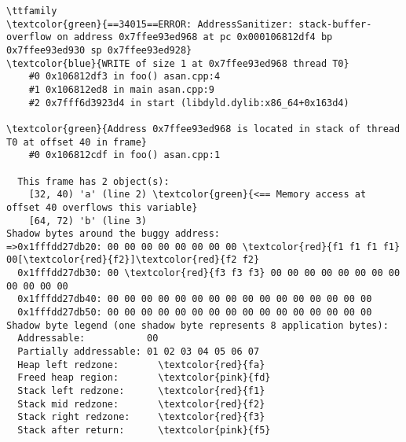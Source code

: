 \begin{frame}[fragile]
  \vspace{-1\baselineskip}
  \begin{columns}
    \column{\textwidth+1cm}
    \scriptsize
    \begin{Verbatim}[commandchars=\\\{\}]
    \ttfamily
\textcolor{green}{==34015==ERROR: AddressSanitizer: stack-buffer-overflow on address 0x7ffee93ed968 at pc 0x000106812df4 bp 0x7ffee93ed930 sp 0x7ffee93ed928}
\textcolor{blue}{WRITE of size 1 at 0x7ffee93ed968 thread T0}
    #0 0x106812df3 in foo() asan.cpp:4
    #1 0x106812ed8 in main asan.cpp:9
    #2 0x7fff6d3923d4 in start (libdyld.dylib:x86_64+0x163d4)

\textcolor{green}{Address 0x7ffee93ed968 is located in stack of thread T0 at offset 40 in frame}
    #0 0x106812cdf in foo() asan.cpp:1

  This frame has 2 object(s):
    [32, 40) 'a' (line 2) \textcolor{green}{<== Memory access at offset 40 overflows this variable}
    [64, 72) 'b' (line 3)
Shadow bytes around the buggy address:
=>0x1fffdd27db20: 00 00 00 00 00 00 00 00 \textcolor{red}{f1 f1 f1 f1} 00[\textcolor{red}{f2}]\textcolor{red}{f2 f2}
  0x1fffdd27db30: 00 \textcolor{red}{f3 f3 f3} 00 00 00 00 00 00 00 00 00 00 00 00
  0x1fffdd27db40: 00 00 00 00 00 00 00 00 00 00 00 00 00 00 00 00
  0x1fffdd27db50: 00 00 00 00 00 00 00 00 00 00 00 00 00 00 00 00
Shadow byte legend (one shadow byte represents 8 application bytes):
  Addressable:           00
  Partially addressable: 01 02 03 04 05 06 07
  Heap left redzone:       \textcolor{red}{fa}
  Freed heap region:       \textcolor{pink}{fd}
  Stack left redzone:      \textcolor{red}{f1}
  Stack mid redzone:       \textcolor{red}{f2}
  Stack right redzone:     \textcolor{red}{f3}
  Stack after return:      \textcolor{pink}{f5}
    \end{Verbatim}
  \end{columns}
\end{frame}

